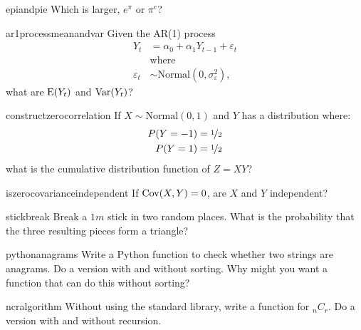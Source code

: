 \documentclass[a4paper]{article}
\begin{document}
\begin{question}{epiandpie}
Which is larger,
$e^\pi$
or
$\pi^e$?
\end{question}



\begin{question}{ar1processmeanandvar}
Given the AR(1) process
\begin{align*}
  Y_t &= \alpha_0 + \alpha_1 Y_{t-1} + \varepsilon_{t} \\
   & \text{where} \\
   \varepsilon_{t} &\sim \text{Normal}(0,\sigma_{\varepsilon}^2)
   \text{,}
\end{align*}
what are
$\operatorname{\mathrm{E}}(Y_t)$
and
$\operatorname{\mathrm{Var}}(Y_t)$?
\end{question}


\begin{question}{constructzerocorrelation}
If $X \sim \text{Normal}(0, 1)$ and $Y$ has a distribution where:
\begin{align*}
 P(Y=-1) &=  \nicefrac{1}{2} \\
 P(Y=1)  &=  \nicefrac{1}{2}
\end{align*}
what is the cumulative distribution function of $Z=XY$?
\end{question}


\begin{question}{iszerocovarianceindependent}
If $\operatorname{\mathrm{Cov}}(X,Y)=0$, are $X$ and $Y$ independent?
\end{question}


\begin{question}{stickbreak}
Break a  $1m$ stick in two random places.
What is the probability that the three resulting pieces form a triangle?
\end{question}


\begin{question}{pythonanagrams}
Write a Python function to check whether two strings are anagrams.
Do a version with and without sorting.
Why might you want a function that can do this without sorting?
\end{question}


\begin{question}{ncralgorithm}
Without using the standard library, write a function for ${}_nC_{r}$.
Do a version with and without recursion.
\end{question}
\end{document}
